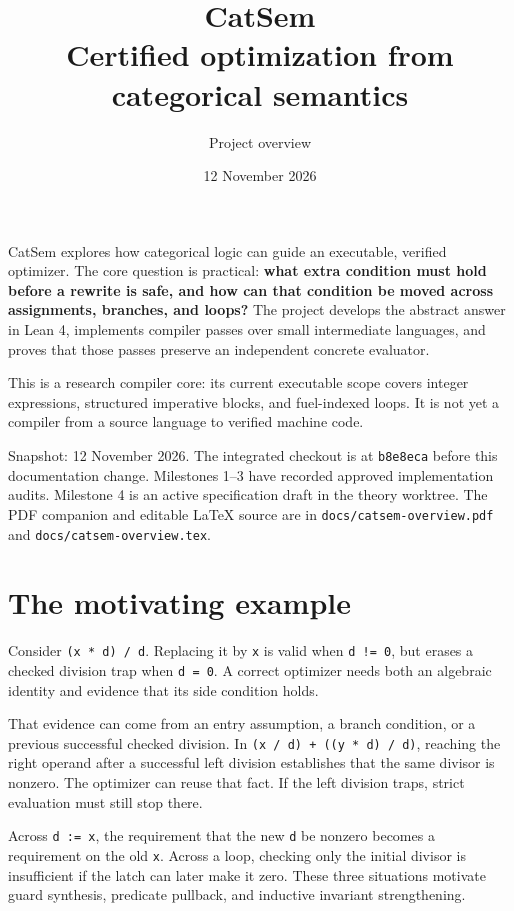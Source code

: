 \documentclass[11pt]{article}
\title{CatSem\\\large Certified optimization from categorical semantics}
\author{Project overview}
\date{12 November 2026}
\begin{document}
\maketitle


CatSem explores how categorical logic can guide an executable, verified optimizer. The core question is practical: \textbf{what extra condition must hold before a rewrite is safe, and how can that condition be moved across assignments, branches, and loops?} The project develops the abstract answer in Lean 4, implements compiler passes over small intermediate languages, and proves that those passes preserve an independent concrete evaluator.

This is a research compiler core: its current executable scope covers integer expressions, structured imperative blocks, and fuel-indexed loops. It is not yet a compiler from a source language to verified machine code.

Snapshot: 12 November 2026. The integrated checkout is at \texttt{b8e8eca} before this documentation change. Milestones 1--3 have recorded approved implementation audits. Milestone 4 is an active specification draft in the theory worktree. The PDF companion and editable LaTeX source are in \texttt{docs/catsem-overview.pdf} and \texttt{docs/catsem-overview.tex}.

\section*{The motivating example}

Consider \texttt{(x * d) / d}. Replacing it by \texttt{x} is valid when \texttt{d != 0}, but erases a checked division trap when \texttt{d = 0}. A correct optimizer needs both an algebraic identity and evidence that its side condition holds.

That evidence can come from an entry assumption, a branch condition, or a previous successful checked division. In \texttt{(x / d) + ((y * d) / d)}, reaching the right operand after a successful left division establishes that the same divisor is nonzero. The optimizer can reuse that fact. If the left division traps, strict evaluation must still stop there.

Across \texttt{d := x}, the requirement that the new \texttt{d} be nonzero becomes a requirement on the old \texttt{x}. Across a loop, checking only the initial divisor is insufficient if the latch can later make it zero. These three situations motivate guard synthesis, predicate pullback, and inductive invariant strengthening.
\end{document}
